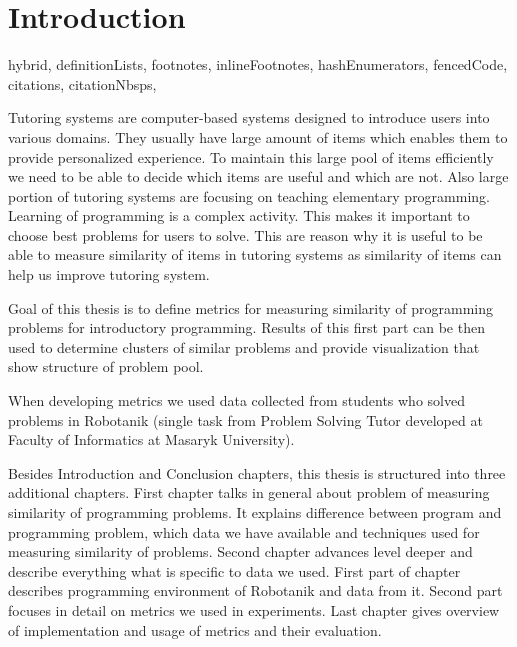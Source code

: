 \documentclass[
  digital, %
  table,   %
  lof,     %
  lot,     %
]{fithesis3}
\begin{document}
\chapter*{Introduction}


\begin{markdown*}{%
  hybrid,
  definitionLists,
  footnotes,
  inlineFootnotes,
  hashEnumerators,
  fencedCode,
  citations,
  citationNbsps,
}

%
%

Tutoring systems are computer-based systems designed to introduce users into various domains.
They usually have large amount of items which enables them to provide personalized experience. To maintain this large pool of items efficiently we need to be able to decide which items are useful and which are not. Also large portion of tutoring systems are focusing on teaching elementary programming. Learning of programming is a complex activity. This makes it important to choose best problems for users to solve.
This are reason why it is useful to be able to measure similarity of items in tutoring systems as similarity of items can help us improve tutoring system.

Goal of this thesis is to define metrics for measuring similarity of programming problems for introductory programming. Results of this first part can be then used to determine clusters of similar problems and provide visualization that show structure of problem pool.

When developing metrics we used data collected from students who solved problems in Robotanik (single task from Problem Solving Tutor developed at Faculty of Informatics at Masaryk University).

Besides Introduction and Conclusion chapters, this thesis is structured into three additional chapters. First chapter talks in general about problem of measuring similarity of programming problems. It explains difference between program and programming problem, which data we have available and techniques used for measuring similarity of problems. Second chapter advances level deeper and describe everything what is specific to data we used. First part of chapter describes programming environment of Robotanik and data from it. Second part focuses in detail on metrics we used in experiments. Last chapter gives overview of implementation and usage of metrics and their evaluation.




%
%


\end{markdown*}
\end{document}
